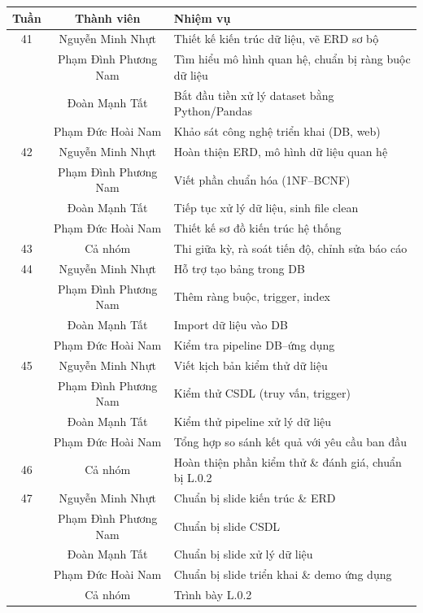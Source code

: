 \documentclass{../hcmut-report}
\begin{document}
\begin{center}
\begin{longtable}{|c|c|p{10cm}|}
\hline
\textbf{Tuần} & \textbf{Thành viên} & \textbf{Nhiệm vụ} \\
\hline
41 & Nguyễn Minh Nhựt & Thiết kế kiến trúc dữ liệu, vẽ ERD sơ bộ \\
   & Phạm Đình Phương Nam & Tìm hiểu mô hình quan hệ, chuẩn bị ràng buộc dữ liệu \\
   & Đoàn Mạnh Tất & Bắt đầu tiền xử lý dataset bằng Python/Pandas \\
   & Phạm Đức Hoài Nam & Khảo sát công nghệ triển khai (DB, web) \\
\hline
42 & Nguyễn Minh Nhựt & Hoàn thiện ERD, mô hình dữ liệu quan hệ \\
   & Phạm Đình Phương Nam & Viết phần chuẩn hóa (1NF–BCNF) \\
   & Đoàn Mạnh Tất & Tiếp tục xử lý dữ liệu, sinh file clean \\
   & Phạm Đức Hoài Nam & Thiết kế sơ đồ kiến trúc hệ thống \\
\hline
43 & Cả nhóm & Thi giữa kỳ, rà soát tiến độ, chỉnh sửa báo cáo \\
\hline
44 & Nguyễn Minh Nhựt & Hỗ trợ tạo bảng trong DB \\
   & Phạm Đình Phương Nam & Thêm ràng buộc, trigger, index \\
   & Đoàn Mạnh Tất & Import dữ liệu vào DB \\
   & Phạm Đức Hoài Nam & Kiểm tra pipeline DB–ứng dụng \\
\hline
45 & Nguyễn Minh Nhựt & Viết kịch bản kiểm thử dữ liệu \\
   & Phạm Đình Phương Nam & Kiểm thử CSDL (truy vấn, trigger) \\
   & Đoàn Mạnh Tất & Kiểm thử pipeline xử lý dữ liệu \\
   & Phạm Đức Hoài Nam & Tổng hợp so sánh kết quả với yêu cầu ban đầu \\
\hline
46 & Cả nhóm & Hoàn thiện phần kiểm thử \& đánh giá, chuẩn bị L.0.2 \\
\hline
47 & Nguyễn Minh Nhựt & Chuẩn bị slide kiến trúc \& ERD \\
   & Phạm Đình Phương Nam & Chuẩn bị slide CSDL \\
   & Đoàn Mạnh Tất & Chuẩn bị slide xử lý dữ liệu \\
   & Phạm Đức Hoài Nam & Chuẩn bị slide triển khai \& demo ứng dụng \\
   & Cả nhóm &   Trình bày L.0.2 \\

\end{longtable}
\end{center}
\end{document}
